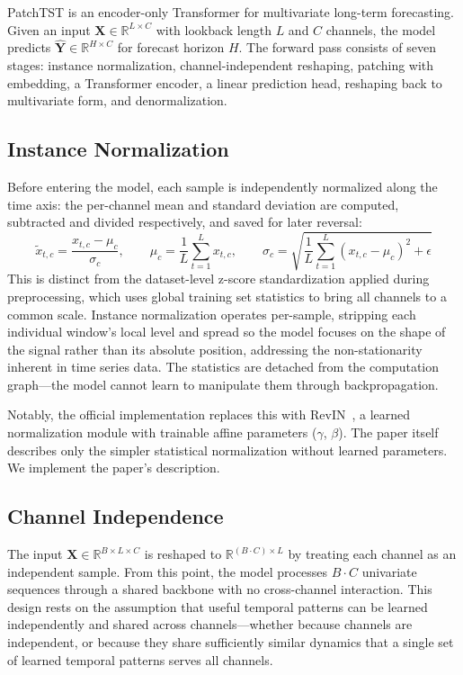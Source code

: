 \documentclass[11pt]{article}
\begin{document}
PatchTST is an encoder-only Transformer for multivariate long-term forecasting. Given an input $\mathbf{X} \in \mathbb{R}^{L \times C}$ with lookback length $L$ and $C$ channels, the model predicts $\hat{\mathbf{Y}} \in \mathbb{R}^{H \times C}$ for forecast horizon $H$. The forward pass consists of seven stages: instance normalization, channel-independent reshaping, patching with embedding, a Transformer encoder, a linear prediction head, reshaping back to multivariate form, and denormalization.

\subsection{Instance Normalization}

Before entering the model, each sample is independently normalized along the time axis: the per-channel mean and standard deviation are computed, subtracted and divided respectively, and saved for later reversal:
\begin{equation}
    \tilde{x}_{t,c} = \frac{x_{t,c} - \mu_c}{\sigma_c}, \qquad
    \mu_c = \frac{1}{L}\sum_{t=1}^{L} x_{t,c}, \qquad
    \sigma_c = \sqrt{\frac{1}{L}\sum_{t=1}^{L}(x_{t,c} - \mu_c)^2 + \epsilon}
\end{equation}
This is distinct from the dataset-level z-score standardization applied during preprocessing, which uses global training set statistics to bring all channels to a common scale. Instance normalization operates per-sample, stripping each individual window's local level and spread so the model focuses on the shape of the signal rather than its absolute position, addressing the non-stationarity inherent in time series data. The statistics are detached from the computation graph---the model cannot learn to manipulate them through backpropagation.

Notably, the official implementation replaces this with RevIN~\cite{revin}, a learned normalization module with trainable affine parameters ($\gamma$, $\beta$). The paper itself describes only the simpler statistical normalization without learned parameters. We implement the paper's description.

\subsection{Channel Independence}

The input $\mathbf{X} \in \mathbb{R}^{B \times L \times C}$ is reshaped to $\mathbb{R}^{(B \cdot C) \times L}$ by treating each channel as an independent sample. From this point, the model processes $B \cdot C$ univariate sequences through a shared backbone with no cross-channel interaction. This design rests on the assumption that useful temporal patterns can be learned independently and shared across channels---whether because channels are independent, or because they share sufficiently similar dynamics that a single set of learned temporal patterns serves all channels.
\end{document}
